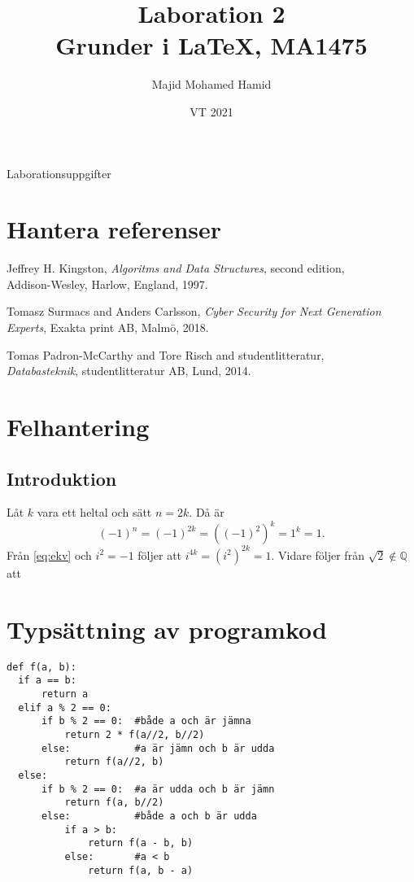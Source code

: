 \documentclass[a4paper, titlepage]{article}
\title{Laboration 2\\Grunder i \LaTeX, MA1475}%
\author{Majid Mohamed Hamid}
\date{VT 2021}
\begin{document}
\maketitle
\begin{center} 
Laborationsuppgifter 
\end{center}

\section{Hantera referenser}

\begin{thebibliography}{0}
 Jeffrey H. Kingston, \emph{Algoritms and Data Structures}, second edition,\\ Addison-Wesley, Harlow, England, 1997.

 Tomasz Surmacs and Anders Carlsson, \emph{Cyber Security for Next Generation\\Experts}, Exakta print AB, Malmö, 2018.

 Tomas Padron-McCarthy and Tore Risch and studentlitteratur, \\\emph{Databasteknik}, studentlitteratur AB, Lund, 2014. 
\end{thebibliography}

\section{Felhantering}
\subsection*{Introduktion}
Låt $k$ vara ett heltal och sätt $n = 2k$. Då är
\begin{equation}\label{eq:ekv}
(-1)^n = (-1)^{2k} = ((-1)^2)^k = 1^k = 1.
\end{equation}
Från \ref{eq:ekv} och $i^2 = -1$ följer att $i^{4k} = (i^2)^{2k} = 1.$ 
Vidare följer från $\sqrt{2} \notin \mathbb{Q}$ att


\section{Typsättning av programkod}
\begin{verbatim}
def f(a, b):
  if a == b:
      return a
  elif a % 2 == 0:
      if b % 2 == 0:  #både a och är jämna
          return 2 * f(a//2, b//2)
      else:           #a är jämn och b är udda
          return f(a//2, b)
  else:
      if b % 2 == 0:  #a är udda och b är jämn
          return f(a, b//2)
      else:           #både a och b är udda
          if a > b:
              return f(a - b, b)
          else:       #a < b
              return f(a, b - a)
\end{verbatim}                
\end{document}
